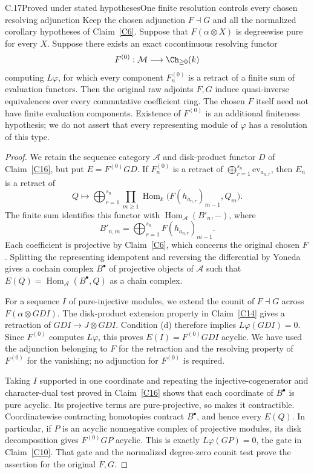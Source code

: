 \begin{claim}{C.17}{Proved under stated hypotheses}{One finite resolution controls every chosen resolving adjunction}\label{C17}
Keep the chosen adjunction $F\dashv G$ and all the normalized corollary hypotheses of Claim~\ref{C6}. Suppose that $F(\alpha\otimes X)$ is degreewise pure for every $X$. Suppose there exists an exact cocontinuous resolving functor
\[
 F^{(0)}:\mathcal M\longrightarrow\Ch_{\geq0}(k)
\]
computing $L\varphi$, for which every component $F^{(0)}_n$ is a retract of a finite sum of evaluation functors. Then the original raw adjoints $F,G$ induce quasi-inverse equivalences over every commutative coefficient ring. The chosen $F$ itself need not have finite evaluation components. Existence of $F^{(0)}$ is an additional finiteness hypothesis; we do not assert that every representing module of $\varphi$ has a resolution of this type.
\end{claim}
\begin{proof}
We retain the sequence category $\mathcal A$ and disk-product functor $D$ of Claim~\ref{C16}, but put $E=F^{(0)}GD$. If $F^{(0)}_n$ is a retract of $\bigoplus_{r=1}^{s_n}\mathrm{ev}_{a_{n,r}}$, then $E_n$ is a retract of
\[
 Q\longmapsto\bigoplus_{r=1}^{s_n}\prod_{m\geq1}
 \operatorname{Hom}_k\bigl(F(h_{a_{n,r}})_{m-1},Q_m\bigr).
\]
The finite sum identifies this functor with $\operatorname{Hom}_{\mathcal A}(B'_n,-)$, where
\[
 B'_{n,m}=\bigoplus_{r=1}^{s_n}F(h_{a_{n,r}})_{m-1}.
\]
Each coefficient is projective by Claim~\ref{C6}, which concerns the original chosen $F$. Splitting the representing idempotent and reversing the differential by Yoneda gives a cochain complex $B^\bullet$ of projective objects of $\mathcal A$ such that $E(Q)=\operatorname{Hom}_{\mathcal A}(B^\bullet,Q)$ as a chain complex.

For a sequence $I$ of pure-injective modules, we extend the counit of $F\dashv G$ across $F(\alpha\otimes GDI)$. The disk-product extension property in Claim~\ref{C14} gives a retraction of $GDI\to J\otimes GDI$. Condition (d) therefore implies $L\varphi(GDI)=0$. Since $F^{(0)}$ computes $L\varphi$, this proves $E(I)=F^{(0)}GDI$ acyclic. We have used the adjunction belonging to $F$ for the retraction and the resolving property of $F^{(0)}$ for the vanishing; no adjunction for $F^{(0)}$ is required.

Taking $I$ supported in one coordinate and repeating the injective-cogenerator and character-dual test proved in Claim~\ref{C16} shows that each coordinate of $B^\bullet$ is pure acyclic. Its projective terms are pure-projective, so \citet[Corollary 5.5]{Stovicek2014C} makes it contractible. Coordinatewise contracting homotopies contract $B^\bullet$, and hence every $E(Q)$. In particular, if $P$ is an acyclic nonnegative complex of projective modules, its disk decomposition gives $F^{(0)}GP$ acyclic. This is exactly $L\varphi(GP)=0$, the gate in Claim~\ref{C10}. That gate and the normalized degree-zero counit test prove the assertion for the original $F,G$.
\end{proof}

